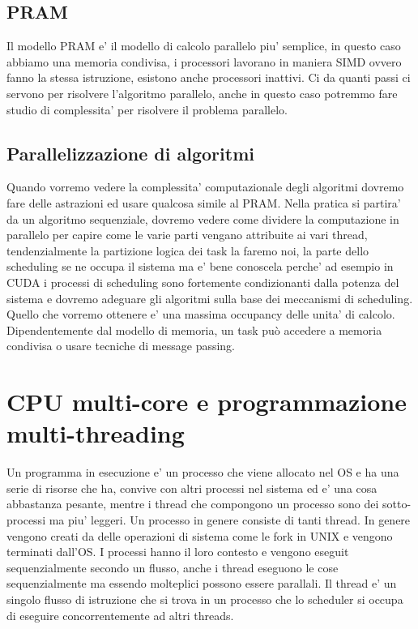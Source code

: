 \subsection{PRAM}
Il modello PRAM e' il modello di calcolo parallelo piu' semplice, in questo caso abbiamo una memoria condivisa, i processori lavorano in maniera SIMD ovvero fanno la stessa istruzione, esistono anche processori inattivi.
Ci da quanti passi ci servono per risolvere l'algoritmo parallelo, anche in questo caso potremmo fare studio di complessita' per risolvere il problema parallelo.

\subsection{Parallelizzazione di algoritmi}
Quando vorremo vedere la complessita' computazionale degli algoritmi dovremo fare delle astrazioni ed usare qualcosa simile al PRAM.
Nella pratica si partira' da un algoritmo sequenziale, dovremo vedere come dividere la computazione in parallelo per capire come le varie parti vengano attribuite ai vari thread, tendenzialmente la partizione logica dei task la faremo noi, la parte dello scheduling se ne occupa il sistema ma e' bene conoscela perche' ad esempio in CUDA i processi di scheduling sono fortemente condizionanti dalla potenza del sistema e dovremo adeguare gli algoritmi sulla base dei meccanismi di scheduling. Quello che vorremo ottenere e' una massima occupancy delle unita' di calcolo.
Dipendentemente dal modello di memoria, un task può accedere a memoria condivisa o usare tecniche di message passing.

\section{CPU multi-core e programmazione multi-threading}
Un programma in esecuzione e' un processo che viene allocato nel OS e ha una serie di risorse che ha, convive con altri processi nel sistema ed e' una cosa abbastanza pesante, mentre i thread che compongono un processo sono dei sotto-processi ma piu' leggeri. Un processo in genere consiste di tanti thread. In genere vengono creati da delle operazioni di sistema come le fork in UNIX e vengono terminati dall'OS.
I processi hanno il loro contesto e vengono eseguit sequenzialmente secondo un flusso, anche i thread eseguono le cose sequenzialmente ma essendo molteplici possono essere parallali.
Il thread e' un singolo flusso di istruzione che si trova in un processo che lo scheduler si occupa di eseguire concorrentemente ad altri threads.

